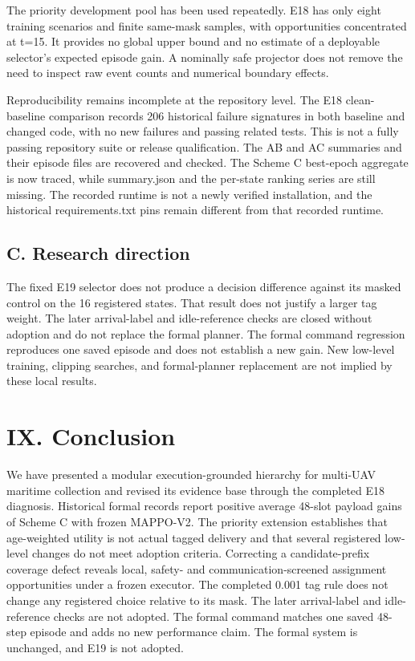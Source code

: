 The priority development pool has been used repeatedly. E18 has only eight training scenarios and finite same-mask samples, with opportunities concentrated at t=15. It provides no global upper bound and no estimate of a deployable selector's expected episode gain. A nominally safe projector does not remove the need to inspect raw event counts and numerical boundary effects.

Reproducibility remains incomplete at the repository level. The E18 clean-baseline comparison records 206 historical failure signatures in both baseline and changed code, with no new failures and passing related tests. This is not a fully passing repository suite or release qualification. The AB and AC summaries and their episode files are recovered and checked. The Scheme C best-epoch aggregate is now traced, while summary.json and the per-state ranking series are still missing. The recorded runtime is not a newly verified installation, and the historical requirements.txt pins remain different from that recorded runtime.

\subsection*{C. Research direction}

The fixed E19 selector does not produce a decision difference against its masked control on the 16 registered states. That result does not justify a larger tag weight. The later arrival-label and idle-reference checks are closed without adoption and do not replace the formal planner. The formal command regression reproduces one saved episode and does not establish a new gain. New low-level training, clipping searches, and formal-planner replacement are not implied by these local results.

\section*{IX. Conclusion}

We have presented a modular execution-grounded hierarchy for multi-UAV maritime collection and revised its evidence base through the completed E18 diagnosis. Historical formal records report positive average 48-slot payload gains of Scheme C with frozen MAPPO-V2. The priority extension establishes that age-weighted utility is not actual tagged delivery and that several registered low-level changes do not meet adoption criteria. Correcting a candidate-prefix coverage defect reveals local, safety- and communication-screened assignment opportunities under a frozen executor. The completed 0.001 tag rule does not change any registered choice relative to its mask. The later arrival-label and idle-reference checks are not adopted. The formal command matches one saved 48-step episode and adds no new performance claim. The formal system is unchanged, and E19 is not adopted.

